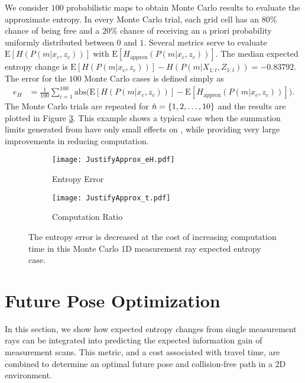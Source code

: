 We consider $100$ probabilistic maps to obtain Monte Carlo results to evaluate the approximate entropy. In every Monte Carlo trial, each grid cell has an $80\%$ chance of being free and a $20\%$ chance of receiving an a priori probability uniformly distributed between $0$ and $1$. 
Several metrics serve to evaluate $\text{E}[H(P(m|x_c,z_{c}))]$ with $\text{E}[H_\text{approx}(P(m|x_c,z_{c}))]$. The median expected entropy change is $\text{E}[H(P(m|x_c,z_{c}))]-H(P(m|X_{1:t},Z_{1:t}))=-0.83792$. The error for the $100$ Monte Carlo cases is defined simply as
\begin{align}
e_{H}&=\frac1{100}\sum_{i=1}^{100}\text{abs}\bigg(\text{E}[H(P(m|x_c,z_{c}))]-\text{E}[H_\text{approx}(P(m|x_c,z_{c}))]\bigg).
\end{align}
The Monte Carlo trials are repeated for $\hat n=\left\{ 1,2,\ldots,10 \right\}$ and the results are plotted in Figure \ref{fig:ApproxJust}.
This example shows a typical case when the summation limits generated from  have only small effects on , while providing very large improvements in reducing computation.

\begin{figure}
	\centering
    	\begin{subfigure}[b]{0.45\textwidth}
        		\texttt{[image: JustifyApprox\_eH.pdf]}
        		\caption{Entropy Error}
        		\label{fig:H_err}
    	\end{subfigure}
	\begin{subfigure}[b]{0.45\textwidth}
        		\texttt{[image: JustifyApprox\_t.pdf]}
        		\caption{Computation Ratio}
        		\label{fig:H_comp_ratio}
    	\end{subfigure}
\caption{The entropy error is decreased at the cost of increasing computation time in this Monte Carlo 1D measurement ray expected entropy case.}
\label{fig:ApproxJust}
\end{figure}





\section{Future Pose Optimization}

In this section, we show how expected entropy changes from single measurement rays can be integrated into predicting the expected information gain of measurement scans. This metric, and a cost associated with travel time, are combined to determine an optimal future pose and collision-free path in a 2D environment.

